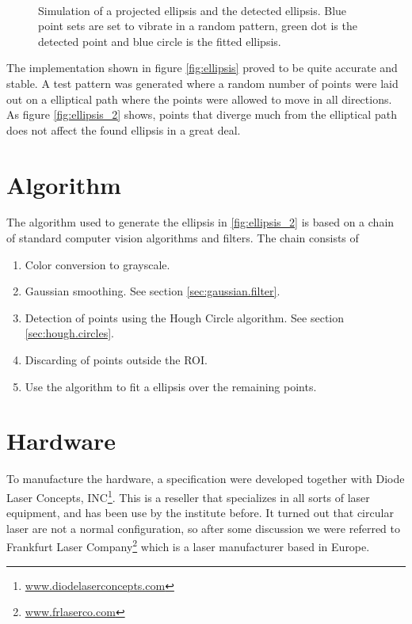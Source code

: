 \begin{figure}[htbp]
    \centering
    \\
	\caption{Simulation of a projected ellipsis and the detected ellipsis. Blue point sets are set to vibrate in a random pattern, green dot is the detected point and blue circle is the fitted ellipsis.}
	\label{fig:ellipsis}
\end{figure}

The implementation shown in figure \vref{fig:ellipsis} proved to be quite accurate and stable.
A test pattern was generated where a random number of points were laid out on a 
elliptical path where the points were allowed to move in all directions. As figure \vref{fig:ellipsis_2} shows, points 
that diverge much from the elliptical path does not affect the found ellipsis in a great deal.

\section{Algorithm}
The algorithm used to generate the ellipsis in \vref{fig:ellipsis_2} is based on a chain of standard 
computer vision algorithms and filters. The chain consists of

\begin{enumerate}
	\item Color conversion to grayscale.
	\item Gaussian smoothing. See section \vref{sec:gaussian.filter}.
	\item Detection of points using the Hough Circle algorithm. See section \vref{sec:hough.circles}.
	\item Discarding of points outside the ROI.
	\item Use the \citet{fitzgibbon95} algorithm to fit a ellipsis over the remaining points.
\end{enumerate}

\section{Hardware}
To manufacture the hardware, a specification were developed together with Diode Laser Concepts, INC\footnote{\url{www.diodelaserconcepts.com}}. This is a reseller that 
specializes in all sorts of laser equipment, and has been use by the institute before. It turned out that circular laser 
are not a normal configuration, so after some discussion we were referred to Frankfurt Laser Company\footnote{\url{www.frlaserco.com}} which 
is a laser manufacturer based in Europe.

